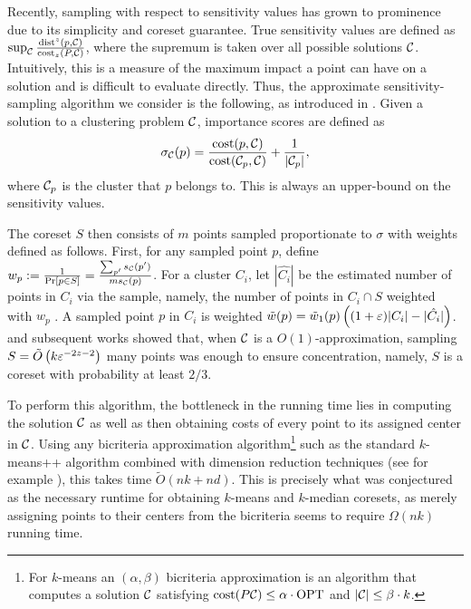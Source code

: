 Recently, sampling with respect to sensitivity values has grown to prominence due to its simplicity and coreset guarantee.  True sensitivity values are defined
as $\sup_{\mathcal C} \frac{\operatorname{dist}^z(p, \mathcal C)}{\operatorname{cost}_z(P, \mathcal C)}$, where the supremum is taken over all possible solutions $\mathcal C$. Intuitively, this is a measure
of the maximum impact a point can have on a solution and is difficult to evaluate directly.
Thus, the approximate sensitivity-sampling algorithm we consider is the following, as introduced in \cite{FeldmanL11}.
Given a solution to a clustering problem $\mathcal C$, importance scores are defined as
\begin{equation}
\label{eq:sensitivity}
\sigma_\mathcal C(p) = \dfrac{\operatorname{cost}(p, \mathcal C)}{\operatorname{cost}(\mathcal C_{p}, \mathcal C)} + \dfrac{1}{|\mathcal C_p|},
\end{equation}
where $\mathcal C_p$ is the cluster that $p$ belongs to. This is always an upper-bound on the sensitivity values.

The coreset $S$ then consists of $m$ points sampled proportionate to $\sigma$ with weights defined as follows. First, for any sampled point $p$, define $w_p :=
\frac{1}{\Pr[p \in S]} = \frac{\sum_{p'} s_\mathcal C(p')}{m s_\mathcal C(p)}$. For a cluster $C_i$, let $|\hat{C_i}|$ be the estimated number of points in $C_i$ via the
sample, namely, the number of points in $C_i \cap S$ weighted with $w_p$ . A sampled point $p$ in $C_i$ is weighted $\tilde w(p) = \tilde w_1(p) \left( (1+\varepsilon)|C_i|
- |\hat{C_i}|\right)$.  \cite{FeldmanL11} and subsequent works showed that, when $\mathcal C$ is a $O(1)$-approximation, sampling $S = \tilde O\left(
k \varepsilon^{-2z-2}\right)$ many points was enough to ensure concentration, namely, $S$ is a coreset with probability at least $2/3$.

To perform this algorithm, the bottleneck in the running time lies in computing the solution $\mathcal C$ as well as then obtaining costs of every point to its
assigned center in $\mathcal C$. Using any bicriteria approximation algorithm\footnote{For $k$-means an $(\alpha,\beta)$ bicriteria approximation is an algorithm
that computes a solution $\mathcal C$ satisfying $\operatorname{cost}(P\mathcal C)\leq \alpha\cdot \text{OPT}$ and $|\mathcal C|\leq \beta\cdot k$.} such as the standard $k$-means++ algorithm
\cite{ArV07} combined with dimension reduction techniques (see for example \cite{BecchettiBC0S19,CohenEMMP15,MakarychevMR19}), this takes time $\tilde O(nk
+nd)$. This is precisely what was conjectured as the necessary runtime for obtaining $k$-means and $k$-median coresets, as merely assigning points to their
centers from the bicriteria seems to require $\Omega(nk)$ running time.

